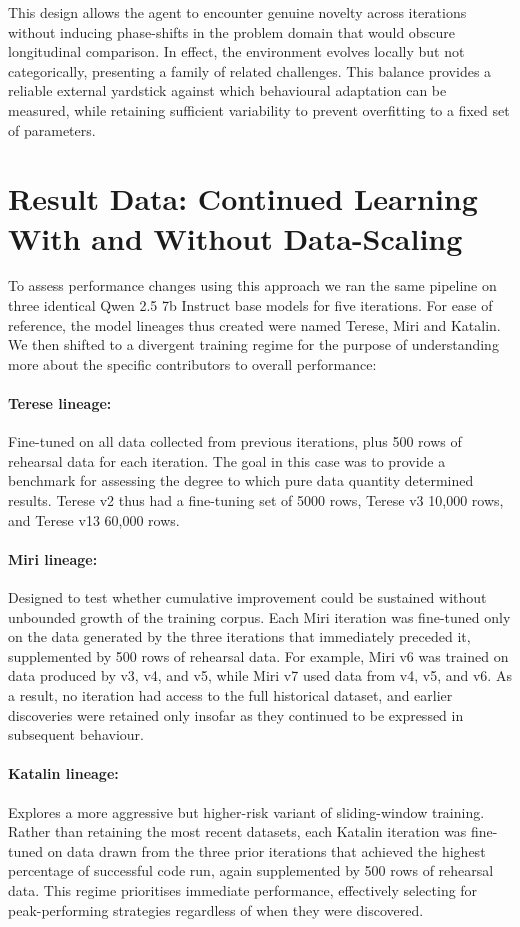 \documentclass{article}
\begin{document}
This design allows the agent to encounter genuine novelty across iterations without inducing phase-shifts in the problem domain that would obscure longitudinal comparison. In effect, the environment evolves locally but not categorically, presenting a family of related challenges. This balance provides a reliable external yardstick against which behavioural adaptation can be measured, while retaining sufficient variability to prevent overfitting to a fixed set of parameters.

\section{Result Data: Continued Learning With and Without Data-Scaling}
To assess performance changes using this approach we ran the same pipeline on three identical Qwen 2.5 7b Instruct base models for five iterations. For ease of reference, the model lineages thus created were named Terese, Miri and Katalin. We then shifted to a divergent training regime for the purpose of understanding more about the specific contributors to overall performance:

\paragraph{Terese lineage:} Fine-tuned on all data collected from previous iterations, plus 500 rows of rehearsal data for each iteration. The goal in this case was to provide a benchmark for assessing the degree to which pure data quantity determined results. Terese v2 thus had a fine-tuning set of 5000 rows, Terese v3 10,000 rows, and Terese v13 60,000 rows. 

\paragraph{Miri lineage:} Designed to test whether cumulative improvement could be sustained without unbounded growth of the training corpus. Each Miri iteration was fine-tuned only on the data generated by the three iterations that immediately preceded it, supplemented by 500 rows of rehearsal data. For example, Miri v6 was trained on data produced by v3, v4, and v5, while Miri v7 used data from v4, v5, and v6. As a result, no iteration had access to the full historical dataset, and earlier discoveries were retained only insofar as they continued to be expressed in subsequent behaviour.

\paragraph{Katalin lineage:} Explores a more aggressive but higher-risk variant of sliding-window training. Rather than retaining the most recent datasets, each Katalin iteration was fine-tuned on data drawn from the three prior iterations that achieved the highest percentage of successful code run, again supplemented by 500 rows of rehearsal data. This regime prioritises immediate performance, effectively selecting for peak-performing strategies regardless of when they were discovered.
\end{document}

